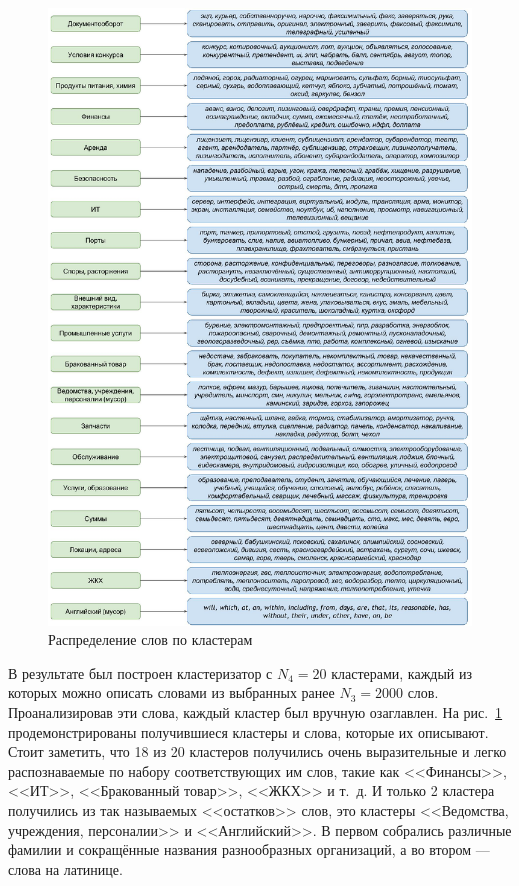 \documentclass[12pt]{article}
\begin{document}
\begin{center}
	\begin{figure}[h!]
		\centering
		\includegraphics[scale=0.7]{images/im4.eps}
		\caption{Распределение слов по кластерам}
		\label{im4}
	\end{figure}
\end{center}

В результате был построен кластеризатор с $N_4 = 20$ кластерами, каждый из которых можно описать словами из выбранных ранее $N_3 = 2000$ слов. Проанализировав эти слова, каждый кластер был вручную озаглавлен. На рис.~\ref{im4} продемонстрированы получившиеся кластеры и слова, которые их описывают. Стоит заметить, что 18 из 20 кластеров получились очень выразительные и легко распознаваемые по набору соответствующих им слов, такие как <<Финансы>>, <<ИТ>>, <<Бракованный товар>>, <<ЖКХ>> и т.~д. И только 2 кластера получились из так называемых <<остатков>> слов, это кластеры <<Ведомства, учреждения, персоналии>> и <<Английский>>. В первом собрались различные фамилии и сокращённые названия разнообразных организаций, а во втором --- слова на латинице.
\end{document}
